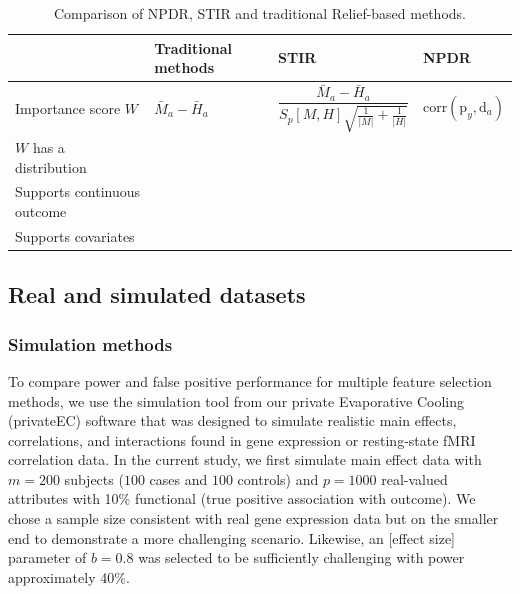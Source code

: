 \documentclass[10pt]{article}
\begin{document}
\begin{table}[h]

\begin{tabular}{p{4.5cm}C{2cm}C{3.2cm}C{2.7cm}}
                           & Traditional methods & STIR    & NPDR \\
\hline
Importance score $W$        & $\bar{M}_a - \bar{H}_a    $                      & $\dfrac{\bar{M}_a - \bar{H}_a }{S_p[M,H]\sqrt{\frac{1}{|M|}+\frac{1}{|H|}}}$ &   $\text{corr}\left(\text{p}_y ,\text{d}_a  \right)$ \\
$W$ has a distribution       &                                &      &   \\
Supports continuous outcome &                               &       &   \\
Supports covariates         &                                &       &  \\
\hline
\end{tabular}
\caption{Comparison of NPDR, STIR and traditional Relief-based methods.}
\label{tab:compare_npdr}
\end{table}



\subsection{Real and simulated datasets}
\subsubsection{Simulation methods}
To compare power and false positive performance for multiple feature selection methods, we use the simulation tool from our private Evaporative Cooling (privateEC) software \cite{le17} that was designed to simulate realistic main effects, correlations, and interactions found in gene expression or resting-state fMRI correlation data. In the current study, we first simulate main effect data with $m=200$ subjects ($100$ cases and $100$ controls) and $p=1000$ real-valued attributes with 10\% functional (true positive association with outcome).
We chose a sample size consistent with real gene expression data but on the smaller end to demonstrate a more challenging scenario.
Likewise, an [effect size] parameter of $b=0.8$ was selected to be sufficiently challenging with power approximately 40\%. 
\end{document}
